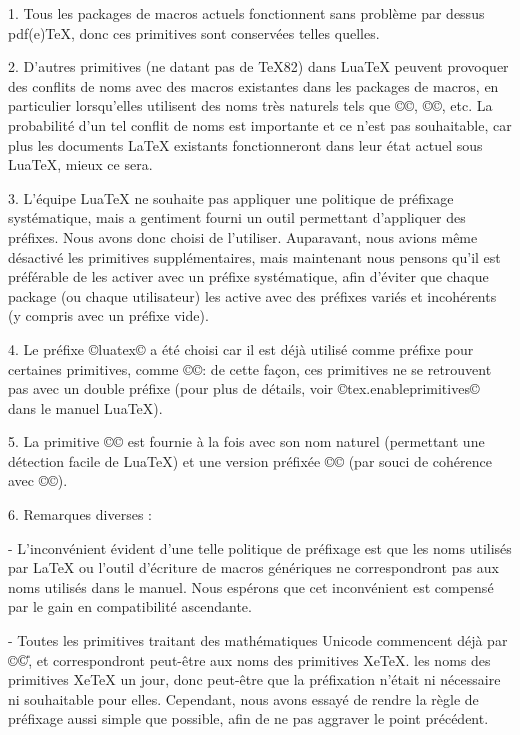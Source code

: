 \documentclass{lltxdoc}
\begin{document}
1. Tous les packages de macros actuels fonctionnent sans problème par dessus pdf(e)TeX, donc ces primitives sont conservées telles quelles.

2. D'autres primitives (ne datant pas de TeX82) dans LuaTeX peuvent provoquer des conflits de noms avec des macros existantes dans les packages de macros, en particulier lorsqu'elles utilisent des noms très \og{}naturels\fg{} tels que ©\outputbox©, ©\mathstyle©, etc. La probabilité d'un tel conflit de noms est importante et ce n'est pas souhaitable, car plus les documents LaTeX existants fonctionneront dans leur état actuel sous LuaTeX, mieux ce sera.

3. L'équipe LuaTeX ne souhaite pas appliquer une politique de préfixage systématique, mais a gentiment fourni un outil permettant d'appliquer des préfixes. Nous avons donc choisi de l'utiliser. Auparavant, nous avions même désactivé les primitives supplémentaires, mais maintenant nous pensons qu'il est préférable de les activer avec un préfixe systématique, afin d'éviter que chaque package (ou chaque utilisateur) les active avec des préfixes variés et incohérents (y compris avec un préfixe vide).

4. Le préfixe ©luatex© a été choisi car il est déjà utilisé comme préfixe pour certaines primitives, comme ©\luatexversion©: de cette façon, ces primitives ne se retrouvent pas avec un double préfixe (pour plus de détails, voir ©tex.enableprimitives© dans le manuel LuaTeX).

5. La primitive ©\directlua© est fournie à la fois avec son nom naturel (permettant une détection facile de LuaTeX) et une version préfixée ©\luatexdirectlua© (par souci de cohérence avec ©\luatexlatelua©).

6. Remarques diverses :

- L'inconvénient évident d'une telle politique de préfixage est que les noms utilisés par LaTeX ou l'outil d'écriture de macros génériques ne correspondront pas aux noms utilisés dans le manuel. Nous espérons que cet inconvénient est compensé par le gain en compatibilité ascendante.

- Toutes les primitives traitant des mathématiques Unicode commencent déjà par ©\U©, et correspondront peut-être aux noms des primitives XeTeX. les noms des primitives XeTeX un jour, donc peut-être que la préfixation n'était ni nécessaire ni souhaitable pour elles. Cependant, nous avons essayé de rendre la règle de préfixage aussi simple que possible, afin de ne pas aggraver le point précédent.
\end{document}
